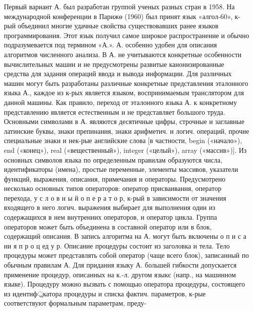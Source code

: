 \documentclass[10pt]{article}
\begin{document}
Первый вариант А. был разработан группой ученых разных стран в 1958. На международной конференции в Парижө (1960) был принят язык «алгол-60», к-рый объединил многие удачные свойства существовавших ранее языков программирования. Этот язык получил самое широкое распространение и обычно подразумевается под термином «А.». А. особенно удобен для описания алгоритмов численного анализа. В А. не учитываются конкретные особенности вычислительных машин и не предусмотрены развитые канонизированные средства для задания операций ввода и вывода информации. Для различных машин могут быть разработаны различные конкретные представления эталонного языка А., каждое из к-рых является языком, воспринимаемым транслятором для данной машины. Как правило, переход от эталонного языка А. к конкретному представлению является естественным и не представляет большого труда. Основными символами в А. являются десятичные цифры, строчные и заглавные латинские буквы, знаки препинания, знаки арифметич. и логич. операций, прочие специальные знаки и нек-рые английские слова [в частности, begin («начало»), end («конец»), real («вещественный»), integer («целый»), array («массив»)]. Из основных символов языка по определенным правилам образуются числа, идентификаторы (имена), простые переменные, элементы массивов, указатели функций, выражения, описания, примечания и операторы. Предусмотрено несколько основных типов операторов: оператор присваивания, оператор перехода, у с л о в н ы й о п е р а т о р, к-рый в зависимости от значения входящего в него логич. выражения выбирает для выполнения один из содержащихся в нем внутренних операторов, и оператор цикла. Группа операторов может быть объединена в составной оператор или в блок, содержащий описания. В запись алгоритма на А. могут быть включены о п и с а ни я п р о ц ед у р. Описание процедуры состоит из заголовка и тела. Тело процедуры может представлять собой оператор (чаще всего блок), записанный по обычным правилам А. Для придания языку А. большей гибкости допускается применение процедур, описанных на к.-л. другом языкє (напр., на машинном языке). Процедуру можно вызвать с помощью оператора процедуры, состоящего из идентиф্রкатора процедуры и списка фактич. параметров, к-рые соответствуют формальным параметрам, преду-
\end{document}
